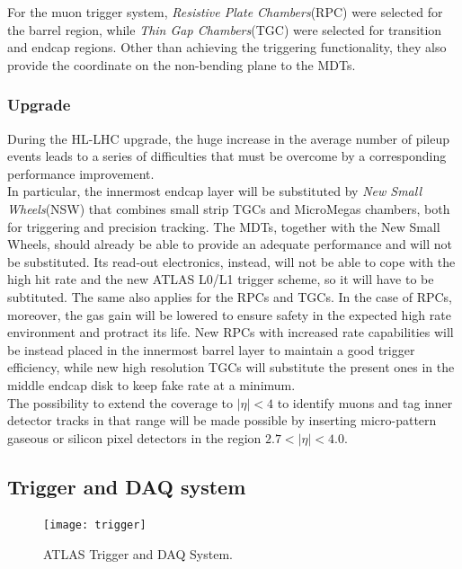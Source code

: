 \documentclass[a4paper,twoside,12pt]{article}
\begin{document}
For the muon trigger system, \textit{Resistive Plate Chambers}(RPC) were selected for the barrel region, while \textit{Thin Gap Chambers}(TGC) were selected for transition and endcap regions. Other
than achieving the triggering functionality, they also provide the coordinate on the non-bending plane to the MDTs. 

\subsubsection{Upgrade}\cite{scoping}
During the HL-LHC upgrade, the huge increase in the average number of pileup events leads to a series of difficulties that must be overcome by a corresponding performance improvement.\\

In particular, the innermost endcap layer will be substituted by \textit{New Small Wheels}(NSW) that combines small strip TGCs and MicroMegas chambers, both for triggering and 
precision tracking. The MDTs, together with the New Small Wheels, should already be able to provide an adequate performance and will not be substituted. Its read-out electronics, instead, will not 
be able to cope with the high hit rate and the new ATLAS L0/L1 trigger scheme, so it will have to be subtituted. The same also applies for the RPCs and TGCs. In the case of RPCs, moreover,
the gas gain will be lowered to ensure safety in the expected high rate environment and protract its life. New RPCs with increased rate capabilities will be instead placed in the innermost barrel layer to maintain a
good trigger efficiency, while new high resolution TGCs will substitute the present ones in the middle endcap disk to keep fake rate at a minimum.\\

The possibility to extend the coverage to $|\eta| < 4$ to identify muons and tag inner detector tracks in that range will be made possible by inserting micro-pattern gaseous or silicon pixel
detectors in the region $2.7 < |\eta| < 4.0$.

\subsection{Trigger and DAQ system}

\begin{figure} [h]
	\centering
	\texttt{[image: trigger]}
	\caption{ATLAS Trigger and DAQ System\cite{Green:2010zza}.}
	\label{fig:trigger}
\end{figure}
\end{document}
